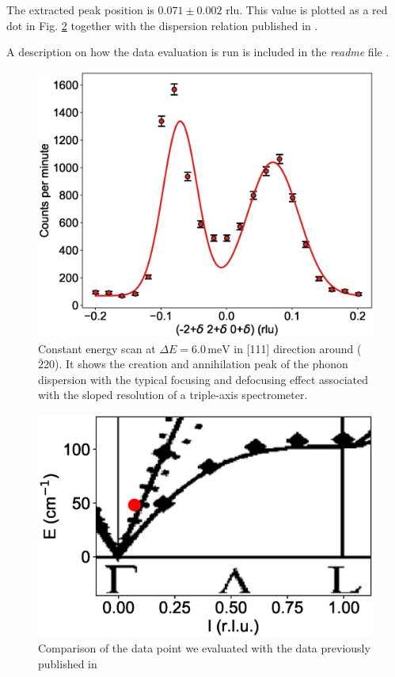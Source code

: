 \documentclass[aps,pra,reprint,amsmath,amssymb,superscriptaddress,showkeys]{revtex4-1}
\begin{document}
The extracted peak position is $0.071 \pm  0.002$ rlu. 
This value is plotted as a red dot in Fig. \ref{fig2} together with the dispersion relation published in \cite{Aouissi}.

A description on how the data evaluation is run is included in the \emph{readme} file \cite{data-evaluation}.


\begin{figure}
    \includegraphics[width=1.0\linewidth]{energy-scan.eps}
    \caption{\label{fig1} Constant energy scan at $\Delta E = 6.0\,\mathrm{meV}$ in [111] direction around ($\bar{2}20$). It shows the creation and annihilation peak of the phonon dispersion with the typical focusing and defocusing effect associated with the sloped resolution of a triple-axis spectrometer.}
\end{figure}

\begin{figure}
    \includegraphics[width=1.0\linewidth]{dispersion.eps}
    \caption{Comparison of the data point we evaluated with the data previously published in \cite{Aouissi} }
    \label{fig2}
\end{figure}
\end{document}
